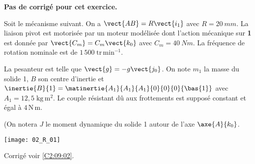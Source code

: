 \normaltrue
\correctionfalse


\setcounter{numques}{0}
\ifcorrection
\else
\textbf{Pas de corrigé pour cet exercice.}
\fi

\ifprof
\else
Soit le mécanisme suivant. On a $\vect{AB}=R\vect{i_1}$ avec $R=\SI{20}{mm}$. La liaison pivot est motorisée par un moteur modélisée dont l'action mécanique sur \textbf{1} est donnée par $\vect{C_m}=C_m \vect{k_0}$ avec $C_m = \SI{40}{Nm}$. La fréquence de rotation nominale est de $1\,500\; \text{tr}\,\text{min}^{-1}$. 

 La pesanteur est telle que $\vect{g}=-g\vect{j_0}$.
On note $m_1$ la masse du solide 1, $B$ son centre d'inertie et $\inertie{B}{1}=\matinertie{A_1}{A_1}{A_1}{0}{0}{0}{\bas{1}}$ avec $A_1 = 12,5\; \text{kg}\,\text{m}^2$.
 Le couple résistant dû aux frottements est supposé constant et égal à $4\, \text{N} \, \text{m}$.

(On notera $J$ le moment dynamique du solide 1 autour de l'axe $\axe{A}{k_0}$.

\begin{center}
\texttt{[image: 02\_R\_01]}
\end{center}

\fi


\ifprof
\else
\fi

\ifprof
\else
\fi



\ifprof
\else
\begin{flushright}
\footnotesize{Corrigé  voir \ref{C2:09:02}.}
\end{flushright}%
\fi